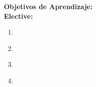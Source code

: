 \noindent \textbf{Objetivos de Aprendizaje:}\\
\noindent \textbf{Elective:}
\begin{enumerate}
	\setcounter{enumi}{0}
	\item \HCIProgrammingInteractiveSystemsLOExplainTheModel\xspace[\HCIProgrammingInteractiveSystemsLOExplainTheModelLevel]\label{sec:BOK:HCIProgrammingInteractiveSystemsLOExplainTheModel}
	\item \HCIProgrammingInteractiveSystemsLOCreateAn\xspace[\HCIProgrammingInteractiveSystemsLOCreateAnLevel]\label{sec:BOK:HCIProgrammingInteractiveSystemsLOCreateAn}
	\item \HCIProgrammingInteractiveSystemsLOIdentifyCommonalities\xspace[\HCIProgrammingInteractiveSystemsLOIdentifyCommonalitiesLevel]\label{sec:BOK:HCIProgrammingInteractiveSystemsLOIdentifyCommonalities}
	\item \HCIProgrammingInteractiveSystemsLOExplainAndProgramming\xspace[\HCIProgrammingInteractiveSystemsLOExplainAndProgrammingLevel]\label{sec:BOK:HCIProgrammingInteractiveSystemsLOExplainAndProgramming}
\end{enumerate}



